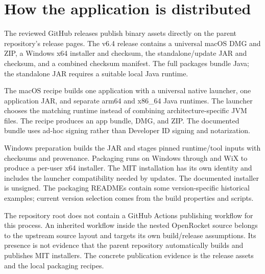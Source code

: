 
\section{How the application is distributed}
The reviewed GitHub releases publish binary assets directly on the parent repository's release pages. The v6.4 release contains a universal macOS DMG and ZIP, a Windows x64 installer and checksum, the standalone/update JAR and checksum, and a combined checksum manifest. The full packages bundle Java; the standalone JAR requires a suitable local Java runtime.

The macOS recipe builds one application with a universal native launcher, one application JAR, and separate arm64 and x86\_64 Java runtimes. The launcher chooses the matching runtime instead of combining architecture-specific JVM files. The recipe produces an app bundle, DMG, and ZIP. The documented bundle uses ad-hoc signing rather than Developer ID signing and notarization.

Windows preparation builds the JAR and stages pinned runtime/tool inputs with checksums and provenance. Packaging runs on Windows through  and WiX to produce a per-user x64 installer. The MIT installation has its own identity and includes the launcher compatibility needed by updates. The documented installer is unsigned. The packaging READMEs contain some version-specific historical examples; current version selection comes from the build properties and scripts.

The repository root does not contain a GitHub Actions publishing workflow for this process. An inherited workflow inside the nested OpenRocket source belongs to the upstream source layout and targets its own build/release assumptions. Its presence is not evidence that the parent repository automatically builds and publishes MIT installers. The concrete publication evidence is the release assets and the local packaging recipes.


